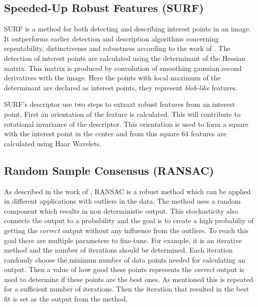 \subsection{Speeded-Up Robust Features (SURF)}
SURF is a method for both detecting and describing interest points in an image.
It outperforms earlier detection and description algorithms concerning repeatability, distinctivenss and robustness according to the work of \cite{SURF}.
The detection of interest points are calculated using the determinant of the Hessian matrix.
This matrix is produced by convolution of smoothing gaussian second derivatives with the image.
Here the points with local maximum of the determinant are declared as interest points, they represent {\it blob-like} features.

SURF's descriptor use two steps to extraxt robust features from an interest point.
First an orientation of the feature is calculated.
This will contribute to rotational invariance of the descriptor.
This orientation is used to form a square with the interest point in the center and from this square 64 features are calculated using Haar Wavelets.

\subsection{Random Sample Consensus (RANSAC)}
As described in the work of \cite{RANSAC}, RANSAC is a robust method which can be applied in different applications with outliers in the data. 
The method uses a random component which results in non deterministic output. This stochasticity also connects the output to a probability and the goal is to create a high probabiliy of getting the {\it correct} output without any influence from the outliers. 
To reach this goal there are multiple parameters to fine-tune. For example, it is an iterative method and the number of iterations should be determined. Each iteration randomly choose the minimun number of data points needed for calculating an output. 
Then a value of how good these points represents the {\it correct} output is used to determine if these points are the best ones. 
As mentioned this is repeated for a sufficient number of iterations. Then the iteration that resulted in the best fit is set as the output from the method.
